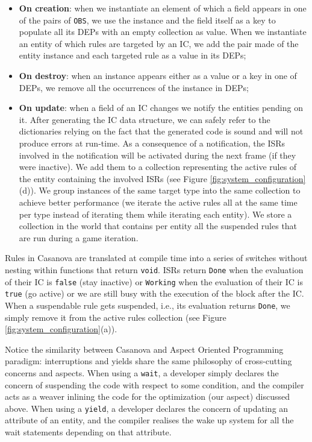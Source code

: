\begin{itemize}
\item \textbf{On creation}: when we instantiate an element of which a field appears in one of the pairs of \texttt{OBS}, we use the instance and the field itself as a key to populate all its DEPs with an empty collection as value. When we instantiate an entity of which rules are targeted by an IC, we add the pair made of the entity instance and each targeted rule as a value in its DEPs;
\item \textbf{On destroy}: when an instance appears either as a value or a key in one of DEPs, we remove all the occurrences of the instance in DEPs;
\item \textbf{On update}: when a field of an IC changes we notify the entities pending on it. After generating the IC data structure, we can safely refer to the dictionaries relying on the fact that the generated code is sound and will not produce errors at run-time. As a consequence of a notification, the ISRs involved in the notification will be activated during the next frame (if they were inactive). We add them to a collection representing the active rules of the entity containing the involved ISRs (see Figure \ref{fig:system_configuration}(d)). We group instances of the same target type into the same collection to achieve better performance (we iterate the active rules all at the same time per type instead of iterating them while iterating each entity). We store a collection in the world that contains per entity all the suspended rules that are run during a game iteration.
\end{itemize}


Rules in Casanova are translated at compile time into a series of switches without nesting within functions that return \texttt{void}. ISRs return \texttt{Done} when the evaluation of their IC is \texttt{false} (stay inactive) or \texttt{Working} when the evaluation of their IC is \texttt{true} (go active) or we are still busy with the execution of the block after the IC. When a suspendable rule gets suspended, i.e., its evaluation returns \texttt{Done}, we simply remove it from the active rules collection (see Figure \ref{fig:system_configuration}(a)).

Notice the similarity between Casanova and Aspect Oriented Programming paradigm: interruptions and yields share the same philosophy of cross-cutting concerns and aspects. When using a \texttt{wait}, a developer simply declares the concern of suspending the code with respect to some condition, and the compiler acts as a weaver inlining the code for the optimization (our aspect) discussed above. When using a \texttt{yield}, a developer declares the concern of updating an attribute of an entity, and the compiler realises the wake up system for all the wait statements depending on that attribute.

